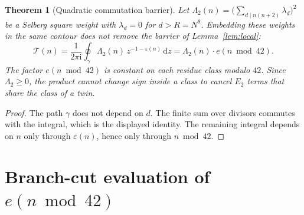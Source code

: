 \documentclass[11pt,a4paper]{article}
\theoremstyle{plain}
\newtheorem{theorem}{Theorem}
\theoremstyle{remark}
\newcommand{\cT}{\mathcal{T}}
\newcommand{\Lam}{\Lambda}
\begin{document}
\begin{theorem}[Quadratic commutation barrier]
\label{thm:comm}
Let \(\Lam_2(n)=\bigl(\sum_{d\mid n(n+2)}\lambda_d\bigr)^2\) be a Selberg square weight with \(\lambda_d=0\) for \(d>R=N^\theta\). Embedding these weights in the same contour does not remove the barrier of Lemma~\ref{lem:local}:
\[
\cT(n)=\frac{1}{2\pi\mathrm{i}}\oint_\gamma\Lam_2(n)\,z^{-1-\varepsilon(n)}\,\mathrm{d}z
=\Lam_2(n)\cdot e(n\bmod 42).
\]
The factor \(e(n\bmod 42)\) is constant on each residue class modulo \(42\). Since \(\Lam_2\ge 0\), the product cannot change sign inside a class to cancel \(E_2\) terms that share the class of a twin.
\end{theorem}

\begin{proof}
The path \(\gamma\) does not depend on \(d\). The finite sum over divisors commutes with the integral, which is the displayed identity. The remaining integral depends on \(n\) only through \(\varepsilon(n)\), hence only through \(n\bmod 42\).
\end{proof}

\section{Branch-cut evaluation of \(e(n\bmod 42)\)}
\end{document}
